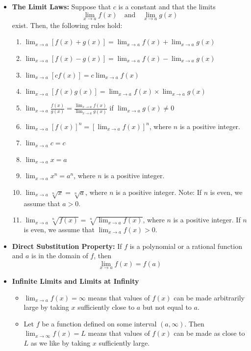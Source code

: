 \documentclass[11pt]{article}
\theoremstyle{definition}
\theoremstyle{remark}
\begin{document}
\begin{itemize}
\item\textbf{The Limit Laws:}
Suppose that $c$ is a constant and that the limits 
\[ \lim_{x\to a} f(x) \quad \text{and} \quad \lim_{x\to a} g(x) \] exist. Then, the following rules hold:
\begin{enumerate}
\item $\lim_{x\to a}[f(x) + g(x)] = \lim_{x\to a}f(x) + \lim_{x\to a}g(x) $
\item $\lim_{x\to a}[f(x) - g(x)] = \lim_{x\to a}f(x) - \lim_{x\to a}g(x) $
\item $\lim_{x\to a}[cf(x)] =  c\lim_{x\to a}f(x) $
\item $\lim_{x\to a}[f(x)g(x)] = \lim_{x\to a}f(x) \times \lim_{x\to a}g(x) $
\item $\displaystyle \lim_{x\to a}\frac{f(x)}{g(x)} = \frac{\displaystyle \lim_{x\to a}f(x)}{\displaystyle \lim_{x\to a}g(x)}$ if $\lim_{x\to a}g(x) \neq 0$
\item $\lim_{x\to a}[f(x)]^n = [\lim_{x\to a} f(x)]^n$, where $n$ is a positive integer.
\item $\lim_{x \to a} c = c$
\item $\lim_{x \to a} x = a$
\item $\lim_{x \to a} x^n = a^n$, where $n$ is a positive integer. 
\item $\lim_{x \to a} \sqrt[n]{x} = \sqrt[n]{a}$, where $n$ is a positive integer. Note: If $n$ is even, we assume that $a>0$. 
\item $\lim_{x \to a} \sqrt[n]{f(x)} = \displaystyle \sqrt[n]{\lim_{x \to a} f(x)}$, where $n$ is a positive integer. If $n$ is even, we assume that $\lim_{x \to a} f(x) >0$. 
\end{enumerate}

\item\textbf{Direct Substitution Property:}
If $f$ is a polynomial or a rational function and $a$ is in the domain of $f$, then 
\begin{equation*}
\lim_{x \to a} f(x) = f(a)
\end{equation*}

\item\textbf{Infinite Limits and Limits at Infinity}
\begin{itemize}

\item $\lim_{x \to a} f(x) = \infty$ means that values of $f(x)$ can be made arbitrarily large by taking $x$ sufficiently close to $a$ but not equal to $a$.

\item Let $f$ be a function defined on some interval $(a, \infty)$. Then $\lim_{x \to \infty} f(x) =L$ means that values of $f(x)$ can be made as close to $L$ as we like by taking $x$ sufficiently large. 
\end{itemize}


\end{itemize}
\end{document}
